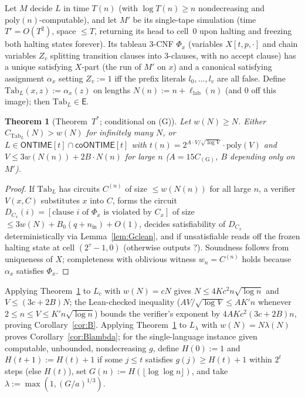 \documentclass[11pt]{article}
\newtheorem{theorem}{Theorem}
\theoremstyle{definition}
\newcommand{\ONTIME}{\mathsf{ONTIME}}
\newcommand{\E}{\mathsf{E}}
\newcommand{\leanus}{\textunderscore\allowbreak}
\newcommand{\lean}[1]{\ifmmode\text{\ttfamily #1}\else{\ttfamily\let\_\leanus #1}\fi}
\begin{document}
Let $M$ decide $L$ in time $T(n)$ (with $\log T(n)\ge n$ nondecreasing and $\mathrm{poly}(n)$-computable), and let $M'$ be its single-tape simulation (time $T'=O(T^2)$, space $\le T$, returning its head to cell~0 upon halting and freezing both halting states forever). Its tableau 3-CNF $\Phi_x$ (variables $X[t,p,\cdot]$ and chain variables $Z_v$ splitting transition clauses into 3-clauses, with no accept clause) has a unique satisfying $X$-part (the run of $M'$ on $x$) and a canonical satisfying assignment $\alpha_x$ setting $Z_v:=1$ iff the prefix literals $l_0,\dots,l_v$ are all false. Define $\mathrm{Tab}_L(x,z):=\alpha_x(z)$ on lengths $N(n):=n+\ell_{\mathrm{lab}}(n)$ (and $0$ off this image); then $\mathrm{Tab}_L\in\E$.

\begin{theorem}[Theorem~$T^*$; conditional on (G)]\label{thm:Tstar}
Let $w(N)\ge N$. Either $C_{\mathrm{Tab}_L}(N)>w(N)$ for infinitely many $N$, or $L\in\ONTIME[t]\cap\mathsf{coONTIME}[t]$ with $t(n)=2^{A\cdot V/\sqrt{\log V}}\cdot\mathrm{poly}(V)$ and $V\le 3w(N(n))+2B\cdot N(n)$ for large $n$ ($A=15C_{(\mathrm{G})}$, $B$ depending only on $M'$).
\end{theorem}

\begin{proof}
If $\mathrm{Tab}_L$ has circuits $C^{(n)}$ of size $\le w(N(n))$ for all large $n$, a verifier $V(x,C)$ substitutes $x$ into $C$, forms the circuit $D_{C_x}(i)=[\text{clause }i\text{ of }\Phi_x\text{ is violated by }C_x]$ of size $\le 3w(N)+B_0(q+n_{\mathrm{in}})+O(1)$, decides satisfiability of $D_{C_x}$ deterministically via Lemma~\ref{lem:Gclean}, and if unsatisfiable reads off the frozen halting state at cell $(2^\tau-1,0)$ (otherwise outputs $?$). Soundness follows from uniqueness of $X$; completeness with oblivious witness $w_n=C^{(n)}$ holds because $\alpha_x$ satisfies $\Phi_x$.
\end{proof}

Applying Theorem~\ref{thm:Tstar} to $L_c$ with $w(N)=cN$ gives $N\le 4Kc^2 n\sqrt{\log n}$ and $V\le (3c+2B)N$; the Lean-checked inequality \lean{sqrt\_saving\_linear} ($A V/\sqrt{\log V}\le A K' n$ whenever $2\le n\le V\le K'n\sqrt{\log n}$) bounds the verifier's exponent by $4AKc^2(3c+2B)n$, proving Corollary~\ref{cor:B}. Applying Theorem~\ref{thm:Tstar} to $L_\lambda$ with $w(N)=N\lambda(N)$ proves Corollary~\ref{cor:Blambda}; for the single-language instance given computable, unbounded, nondecreasing $g$, define $H(0):=1$ and $H(t+1):=H(t)+1$ if some $j\le t$ satisfies $g(j)\ge H(t)+1$ within $2^t$ steps (else $H(t)$), set $G(n):=H(\lfloor\log\log n\rfloor)$, and take $\lambda:=\max(1,(G/a)^{1/3})$.
\end{document}
